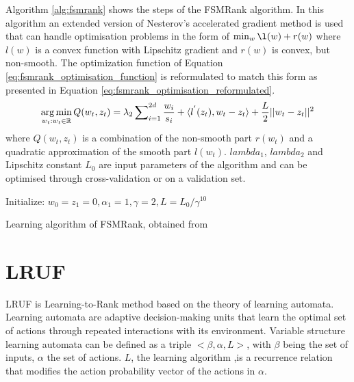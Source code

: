 Algorithm \ref{alg:fsmrank} shows the steps of the FSMRank algorithm. In this algorithm an extended version of Nesterov's accelerated gradient method is used that can handle optimisation problems in the form of $\min_w \l(w) + r(w)$ where $l(w)$ is a convex function with Lipschitz gradient and $r(w)$ is convex, but non-smooth. The optimization function of Equation \ref{eq:fsmrank_optimisation_function} is reformulated to match this form as presented in Equation \ref{eq:fsmrank_optimisation_reformulated}.
\begin{equation}
\operatorname*{arg\,min}_{w_t:w_t\in \mathbb{R}} Q(w_t,z_t) = \lambda_2 \sum\nolimits_{i=1}^{2d}\frac{w_i}{s_i}+\langle l^{'}(z_t),w_t-z_t \rangle+\frac{L}{2}||w_t-z_t||^2
\label{eq:fsmrank_optimisation_reformulated}
\end{equation}
\noindent where $Q(w_t,z_t)$ is a combination of the non-smooth part $r(w_t)$ and a quadratic approximation of the smooth part $l(w_t)$. $lambda_1$, $lambda_2$ and Lipschitz constant $L_0$ are input parameters of the algorithm and can be optimised through cross-validation or on a validation set.\\

\LinesNumbered
\begin{algorithm}[H]
 Initialize: $w_0=z_1=0, \alpha_1=1, \gamma=2, L=L_0/\gamma^{10}$\\
 
 \caption{Learning algorithm of FSMRank, obtained from \cite{Lai2013c}}
 \label{alg:fsmrank}
\end{algorithm}

\section{LRUF}
LRUF \cite{Torkestani2012b} is Learning-to-Rank method based on the theory of learning automata. Learning automata are adaptive decision-making units that learn the optimal set of actions through repeated interactions with its environment. Variable structure learning automata can be defined as a triple $<\beta,\alpha,L>$, with $\beta$ being the set of inputs, $\alpha$ the set of actions. $L$, the learning algorithm ,is a recurrence relation that modifies the action probability vector of the actions in $\alpha$.\\

